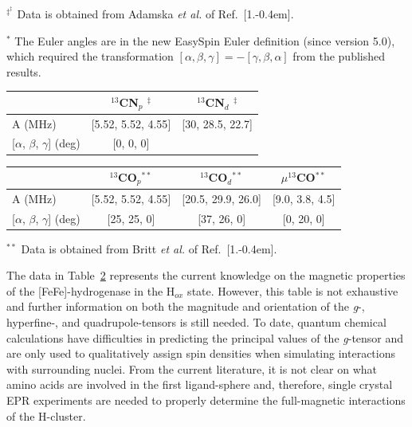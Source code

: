 \begin{table}[hb]
\begin{flushleft}
{$^{\ddagger^\ddagger}$ Data is obtained from Adamska {\em et al.} of Ref.~[1.\kern-0.4em]. 

$^\ast$ The Euler angles are in the new EasySpin Euler definition (since version 5.0), which required the transformation $[\alpha,\beta,\gamma]= -[\gamma,\beta,\alpha]$ from the published results.} \end{flushleft}

\begin{tabular}{l|c|c}
 & $^{13}$CN$_p$ $^\ddagger$ & $^{13}$CN$_d$ $^\ddagger$  \\ \hline \hline
A (MHz) & {[}5.52, 5.52, 4.55{]} & {[}30, 28.5, 22.7{]} \\
{[}$\alpha$, $\beta$, $\gamma${]} (deg) & {[}0, 0, 0{]}  \\
\end{tabular}
\begin{tabular}{l|c|c|c}
 & $^{13}$CO$_p$$^{\ast\ast}$ & $^{13}$CO$_d$$^{\ast\ast}$ & $\mu^{13}$CO$^{\ast\ast}$ \\ \hline \hline
A (MHz) & {[}5.52, 5.52, 4.55{]} &  {[}20.5, 29.9, 26.0{]} & {[}9.0, 3.8, 4.5{]}\\
{[}$\alpha$, $\beta$, $\gamma${]} (deg) &  {[}25, 25, 0{]} & {[}37, 26, 0{]} & {[}0, 20, 0{]} \\
\end{tabular}\label{table:eprthing}

\begin{flushleft}\footnotesize{$^{\ast\ast}$ Data is obtained from Britt {\em et al.} of Ref.~[1.\kern-0.4em].} \end{flushleft}
\end{table}

The data in Table~\ref{table:eprthing} represents the current knowledge on the magnetic properties of the [FeFe]-hydrogenase in the H$_{ox}$ state. However, this table is not exhaustive and further information on both the magnitude and orientation of the \textit{g}-, hyperfine-, and quadrupole-tensors is still needed. To date, quantum chemical calculations have difficulties in predicting the principal values of the \textit{g}-tensor\cite{GrecoDFT, FiedlerDFT} and are only used to qualitatively assign spin densities when simulating interactions with surrounding nuclei. From the current literature, it is not clear on what amino acids are involved in the first ligand-sphere and, therefore, single crystal EPR experiments are needed to properly determine the full-magnetic interactions of the H-cluster. 

